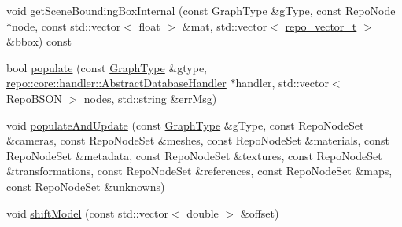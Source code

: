 \begin{DoxyCompactItemize}
\item 
void \hyperlink{classrepo_1_1core_1_1model_1_1_repo_scene_af4324820733d5dae30ee3e8e2580af71}{get\+Scene\+Bounding\+Box\+Internal} (const \hyperlink{classrepo_1_1core_1_1model_1_1_repo_scene_aefcacd6eb4c7774ac1bfe3a6b223337c}{Graph\+Type} \&g\+Type, const \hyperlink{classrepo_1_1core_1_1model_1_1_repo_node}{Repo\+Node} $\ast$node, const std\+::vector$<$ float $>$ \&mat, std\+::vector$<$ \hyperlink{structrepo__vector__t}{repo\+\_\+vector\+\_\+t} $>$ \&bbox) const 
\item 
bool \hyperlink{classrepo_1_1core_1_1model_1_1_repo_scene_a35e5705f991f40cdd1e5e16419bcf244}{populate} (const \hyperlink{classrepo_1_1core_1_1model_1_1_repo_scene_aefcacd6eb4c7774ac1bfe3a6b223337c}{Graph\+Type} \&gtype, \hyperlink{classrepo_1_1core_1_1handler_1_1_abstract_database_handler}{repo\+::core\+::handler\+::\+Abstract\+Database\+Handler} $\ast$handler, std\+::vector$<$ \hyperlink{classrepo_1_1core_1_1model_1_1_repo_b_s_o_n}{Repo\+B\+S\+O\+N} $>$ nodes, std\+::string \&err\+Msg)
\item 
void \hyperlink{classrepo_1_1core_1_1model_1_1_repo_scene_a06729da0c472896cac79f0b0ac91d78f}{populate\+And\+Update} (const \hyperlink{classrepo_1_1core_1_1model_1_1_repo_scene_aefcacd6eb4c7774ac1bfe3a6b223337c}{Graph\+Type} \&g\+Type, const Repo\+Node\+Set \&cameras, const Repo\+Node\+Set \&meshes, const Repo\+Node\+Set \&materials, const Repo\+Node\+Set \&metadata, const Repo\+Node\+Set \&textures, const Repo\+Node\+Set \&transformations, const Repo\+Node\+Set \&references, const Repo\+Node\+Set \&maps, const Repo\+Node\+Set \&unknowns)
\item 
void \hyperlink{classrepo_1_1core_1_1model_1_1_repo_scene_adb2dadf1167735dc3116a9265d6b69ee}{shift\+Model} (const std\+::vector$<$ double $>$ \&offset)
\end{DoxyCompactItemize}
